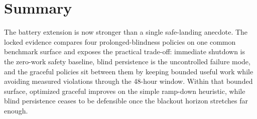 \section{Summary}

The battery extension is now stronger than a single safe-landing anecdote.
The locked evidence compares four prolonged-blindness policies on one common
benchmark surface and exposes the practical trade-off: immediate shutdown is
the zero-work safety baseline, blind persistence is the uncontrolled failure
mode, and the graceful policies sit between them by keeping bounded useful
work while avoiding measured violations through the 48-hour window.  Within
that bounded surface, optimized graceful improves on the simple ramp-down
heuristic, while blind persistence ceases to be defensible once the blackout
horizon stretches far enough.
